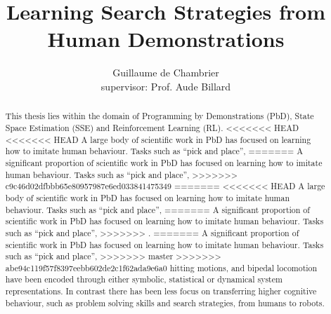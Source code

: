 \documentclass[a4paper,10pt]{article}
\title{Learning Search Strategies from Human Demonstrations}
\author[]{Guillaume de Chambrier\\supervisor: Prof. Aude Billard}
\affil[]{École Polytechnique Fédérale de Lausanne (EPFL), LASA}
\begin{document}
\maketitle

\begin{abstract}
 
This thesis lies within the domain of Programming by Demonstrations (PbD), State Space Estimation (SSE) and Reinforcement Learning (RL). 
<<<<<<< HEAD
<<<<<<< HEAD
A large body of scientific work in PbD has focused on learning how to imitate human behaviour. Tasks such as ``pick and place'', 
=======
A significant proportion of scientific work in PbD has focused on learning how to imitate human behaviour. Tasks such as ``pick and place'', 
>>>>>>> c9c46d02dfbbb65e80957987e6ed033841475349
=======
<<<<<<< HEAD
A large body of scientific work in PbD has focused on learning how to imitate human behaviour. Tasks such as ``pick and place'', 
=======
A significant proportion of scientific work in PbD has focused on learning how to imitate human behaviour. Tasks such as ``pick and place'', 
>>>>>>> .
=======
A significant proportion of scientific work in PbD has focused on learning how to imitate human behaviour. Tasks such as ``pick and place'', 
>>>>>>> master
>>>>>>> abe94c119f57f8397eebb602de2c1f62ada9e6a0
hitting motions, and bipedal locomotion have been encoded through either symbolic, statistical or dynamical system representations. 
In contrast there has been less focus on transferring higher cognitive behaviour, such as problem solving skills and search strategies,
from humans to robots. 


\end{abstract}
\end{document}
